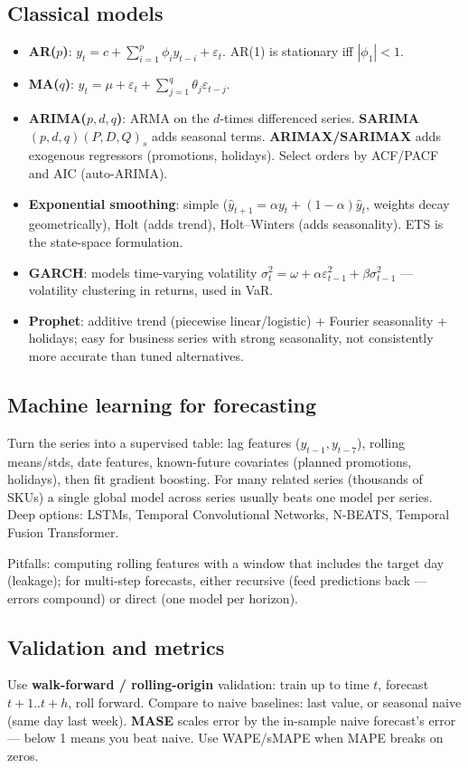 \subsection{Classical models}
\begin{itemize}
  \item \textbf{AR($p$)}: $y_t=c+\sum_{i=1}^p\phi_iy_{t-i}+\varepsilon_t$. AR(1) is stationary iff $|\phi_1|<1$.
  \item \textbf{MA($q$)}: $y_t=\mu+\varepsilon_t+\sum_{j=1}^q\theta_j\varepsilon_{t-j}$.
  \item \textbf{ARIMA($p,d,q$)}: ARMA on the $d$-times differenced series. \textbf{SARIMA}$(p,d,q)(P,D,Q)_s$ adds seasonal terms. \textbf{ARIMAX/SARIMAX} adds exogenous regressors (promotions, holidays). Select orders by ACF/PACF and AIC (auto-ARIMA).
  \item \textbf{Exponential smoothing}: simple ($\hat y_{t+1}=\alpha y_t+(1-\alpha)\hat y_t$, weights decay geometrically), Holt (adds trend), Holt--Winters (adds seasonality). ETS is the state-space formulation.
  \item \textbf{GARCH}: models time-varying volatility $\sigma_t^2=\omega+\alpha\varepsilon_{t-1}^2+\beta\sigma_{t-1}^2$ --- volatility clustering in returns, used in VaR.
  \item \textbf{Prophet}: additive trend (piecewise linear/logistic) + Fourier seasonality + holidays; easy for business series with strong seasonality, not consistently more accurate than tuned alternatives.
\end{itemize}

\subsection{Machine learning for forecasting}
Turn the series into a supervised table: lag features ($y_{t-1},y_{t-7}$), rolling means/stds, date features, known-future covariates (planned promotions, holidays), then fit gradient boosting. For many related series (thousands of SKUs) a single global model across series usually beats one model per series. Deep options: LSTMs, Temporal Convolutional Networks, N-BEATS, Temporal Fusion Transformer.

Pitfalls: computing rolling features with a window that includes the target day (leakage); for multi-step forecasts, either recursive (feed predictions back --- errors compound) or direct (one model per horizon).

\subsection{Validation and metrics}
Use \textbf{walk-forward / rolling-origin} validation: train up to time $t$, forecast $t+1..t+h$, roll forward. Compare to naive baselines: last value, or seasonal naive (same day last week). \textbf{MASE} scales error by the in-sample naive forecast's error --- below 1 means you beat naive. Use WAPE/sMAPE when MAPE breaks on zeros.

